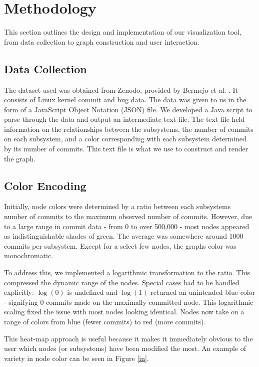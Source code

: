 \documentclass[conference]{IEEEtran}
\begin{document}
\section{Methodology}
\label{method}

This section outlines the design and implementation of our visualization tool, from data collection to graph construction and user interaction.

\subsection{Data Collection}
The dataset used was obtained from Zenodo, provided by Bermejo et al. \cite{zenodo}. It consists of Linux kernel commit and bug data. The data was given to us in the form of a JavaScript Object Notation (JSON) file. We developed a Java script to parse through the data and output an intermediate text file. The text file held information on the relationships between the subsystems, the number of commits on each subsystem, and a color corresponding with each subsystem determined by its number of commits. This text file is what we use to construct and render the graph.

\subsection{Color Encoding}
\label{colE}
Initially, node colors were determined by a ratio between each subsystems number of commits to the maximum observed number of commits. However, due to a large range in commit data - from 0 to over 500,000 - most nodes appeared as indistinguishable shades of green. The average was somewhere around 1000 commits per subsystem. Except for a select few nodes, the graphs color was monochromatic.

To address this, we implemented a logarithmic transformation to the ratio. This compressed the dynamic range of the nodes. Special cases had to be handled explicitly: $\log(0)$ is undefined and $\log(1)$ returned an unintended blue color - signifying $0$ commits made on the maximally committed node. This logarithmic scaling fixed the issue with most nodes looking identical. Nodes now take on a range of colors from blue (fewer commits) to red (more commits).

 This heat-map approach is useful because it makes it immediately obvious to the user which nodes (or subsystems) have been modified the most. An example of variety in node color can be seen in Figure \ref{in}.
\end{document}
